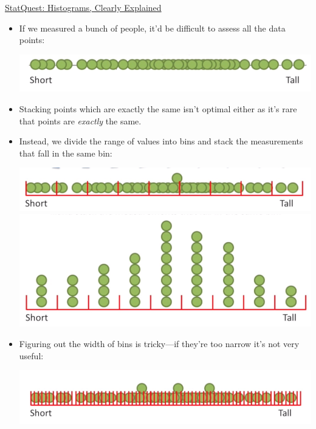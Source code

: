\documentclass[12pt, titlepage, french]{report}
\begin{document}
\begin{YTB_SUMM_AUTO_NUMB}[label = {SQ-histograms}]{\href{https://www.youtube.com/watch?v=qBigTkBLU6g}{StatQuest: Histograms, Clearly Explained}}
\begin{itemize}[leftmargin = *]
	\item	 If we measured a bunch of people, it'd be difficult to assess all the data points:
		\begin{center}
		\includegraphics[scale=0.4]{src/SQ-HIST-LINE.png}
		\end{center}
	\item	Stacking points which are exactly the same isn't optimal either as it's rare that points are \textit{exactly} the same.
	\item	Instead, we divide the range of values into bins and stack the measurements that fall in the same bin:
		\begin{center}
		\includegraphics[scale=0.4]{src/SQ-HIST-BINS.png}
		\includegraphics[scale=0.4]{src/SQ-HIST-BINS-2.png}
		\end{center}
	\item	Figuring out the width of bins is tricky---if they're too narrow it's not very useful:
		\begin{center}
		\includegraphics[scale=0.4]{src/SQ-HIST-BINS-SHORT.png}

\end{center}
\end{itemize}
\end{YTB_SUMM_AUTO_NUMB}
\end{document}
